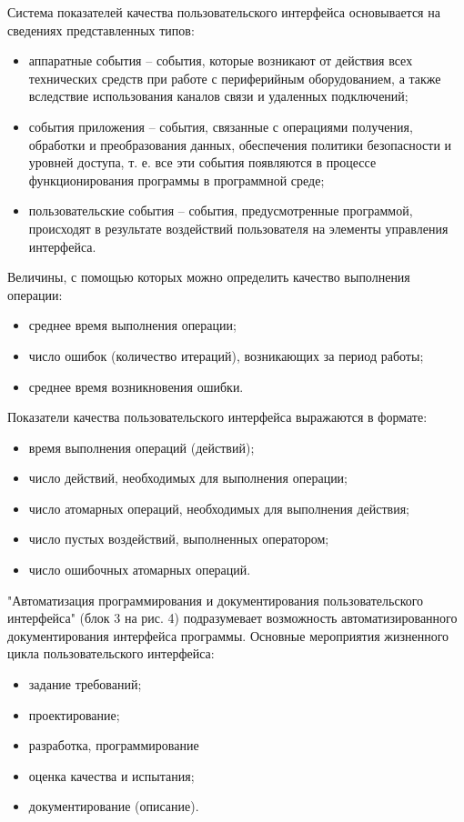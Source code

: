 	Система показателей качества пользовательского интерфейса основывается на сведениях представленных типов:
\begin{itemize}
	\item аппаратные события – события, которые возникают от действия всех технических средств при работе с периферийным оборудованием, а также вследствие использования каналов связи и удаленных подключений;
	\item события приложения – события, связанные с операциями получения, обработки и преобразования данных, обеспечения политики безопасности и уровней доступа, т. е. все эти события появляются в процессе функционирования программы в программной среде;
	\item пользовательские события – события, предусмотренные программой, происходят в результате воздействий пользователя на элементы управления интерфейса.
\end{itemize}

	Величины, с помощью которых можно определить качество выполнения операции:
\begin{itemize}
	\item среднее время выполнения операции; 
	\item число ошибок (количество итераций), возникающих за период работы;
	\item среднее время возникновения ошибки.
\end{itemize}

	Показатели качества пользовательского интерфейса выражаются в формате: 
\begin{itemize}
	\item время выполнения операций (действий); 
	\item число действий, необходимых для выполнения операции; 
	\item число атомарных операций, необходимых для выполнения действия; 
	\item число пустых воздействий, выполненных оператором; 
	\item число ошибочных атомарных операций.
\end{itemize}

	"Автоматизация программирования и документирования пользовательского интерфейса" (блок 3 на рис. 4) подразумевает возможность автоматизированного документирования интерфейса программы.
	Основные мероприятия жизненного цикла пользовательского интерфейса: 
\begin{itemize}
	\item задание требований; 
	\item проектирование; 
	\item разработка, программирование
	\item оценка качества и испытания; 
	\item документирование (описание).
\end{itemize}

